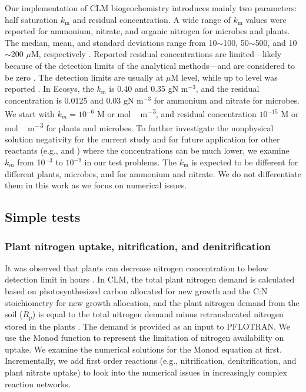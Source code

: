 \documentclass[gmd, manuscript]{copernicus}
\begin{document}
Our implementation of CLM biogeochemistry introduces mainly two parameters:
half saturation $k_\text{m}$ and residual concentration. A wide range of
$k_\text{m}$ values were reported for ammonium, nitrate, and organic nitrogen
for microbes and plants. The median, mean, and standard deviations range from
10$\sim$100, 50$\sim$500, and 10$\sim$200 $\mu$M, respectively
\citep{Kuzyakov2013}. Reported residual concentrations are limited---likely because of the detection
limits of the analytical methods---and are
considered to be zero \cite[e.g.,][]{Hogh1997}. The detection limits are usually at $\mu$M
level, while up to  level was reported \citep{Nollet2013}. In Ecosys,
the $k_\text{m}$ is 0.40 and 0.35 gN m$^{-3}$, and the residual concentration
is 0.0125 and 0.03 gN m$^{-3}$ \citep{Grant2013} for ammonium and nitrate for
microbes. We start with $k_m=10^{-6}$ \unit{M} or \unit{mol\,m^{-3}}, and
residual concentration $10^{-15}$ \unit{M} or \unit{mol\, m^{-3}} for plants
and microbes. To further investigate the nonphysical solution negativity for
the current study and for future application for other reactants (e.g.,
 and ) where the concentrations can be much lower, we
examine $k_m$ from 10$^{-3}$ to $10^{-9}$ in our test problems. The
$k_\text{m}$ is expected to be different for different plants, microbes, and
for ammonium and nitrate. We do not differentiate them in this work as we focus
on numerical issues. 
\subsection{Simple tests}
\subsubsection{Plant nitrogen uptake, nitrification, and denitrification}
\label{sec:test1}
It was observed that plants can decrease nitrogen concentration to below
detection limit in hours \citep{Kamer2001}. 
In CLM, the total plant nitrogen demand is
calculated based on photosynthesized carbon allocated for new growth and the
C:N stoichiometry for new growth allocation, and the plant nitrogen demand from
the soil ($R_p$) is equal to the total nitrogen demand minus retranslocated nitrogen
stored in the plants  \citep{Oleson2013}. The demand is provided
as an input to PFLOTRAN. We use the
Monod function to represent the limitation of nitrogen availability on uptake.
We examine the numerical solutions for the Monod equation at first. Incrementally, we
add first order reactions (e.g., nitrification, denitrification, and plant
nitrate uptake) to look into the numerical issues in increasingly complex reaction networks. 
\end{document}
